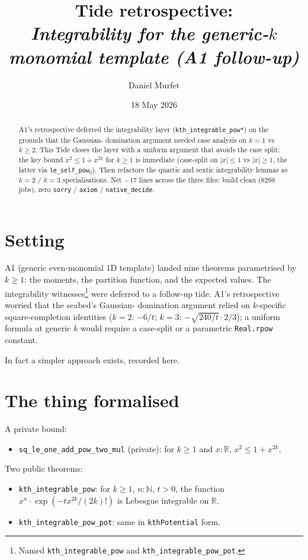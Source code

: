 \documentclass[11pt]{article}
\title{Tide retrospective:\\\emph{Integrability for the generic-$k$ monomial template (A1 follow-up)}}
\author{Daniel Murfet}
\date{18 May 2026}
\begin{document}
\maketitle

\begin{abstract}
A1's retrospective deferred the integrability layer
(\texttt{kth\_integrable\_pow*}) on the grounds that the Gaussian-
domination argument needed case analysis on $k = 1$ vs $k \ge 2$.
This Tide closes the layer with a uniform argument that avoids the
case split: the key bound $x^2 \le 1 + x^{2k}$ for $k \ge 1$ is
immediate (case-split on $|x| \le 1$ vs $|x| \ge 1$, the latter via
\texttt{le\_self\_pow$_0$}). Then refactors the quartic and sextic
integrability lemmas as $k = 2$ / $k = 3$ specialisations. Net
$-17$ lines across the three files; build clean (8298 jobs),
zero \texttt{sorry} / \texttt{axiom} / \texttt{native\_decide}.
\end{abstract}

\section{Setting}

A1 (generic even-monomial 1D template) landed nine theorems
parametrised by $k \ge 1$: the moments, the partition function, and
the expected values. The integrability witnesses\footnote{Named
\texttt{kth\_integrable\_pow} and
\texttt{kth\_integrable\_pow\_pot}.} were deferred to a follow-up
tide. A1's retrospective worried that the seabed's Gaussian-
domination argument relied on $k$-specific square-completion
identities ($k = 2$: $-6/t$; $k = 3$: $-\sqrt{240/t} \cdot 2/3$); a
uniform formula at generic $k$ would require a case-split or a
parametric \texttt{Real.rpow} constant.

In fact a simpler approach exists, recorded here.

\section{The thing formalised}

A private bound:
\begin{itemize}[leftmargin=1.5em]
\item \texttt{sq\_le\_one\_add\_pow\_two\_mul} (private):
  for $k \ge 1$ and $x : \mathbb R$, $x^2 \le 1 + x^{2k}$.
\end{itemize}

Two public theorems:
\begin{itemize}[leftmargin=1.5em]
\item \texttt{kth\_integrable\_pow}: for $k \ge 1$, $n : \mathbb N$,
  $t > 0$, the function $x^n \cdot \exp(-tx^{2k}/(2k)!)$ is Lebesgue
  integrable on $\mathbb R$.
\item \texttt{kth\_integrable\_pow\_pot}: same in
  \texttt{kthPotential} form.
\end{itemize}
\end{document}
